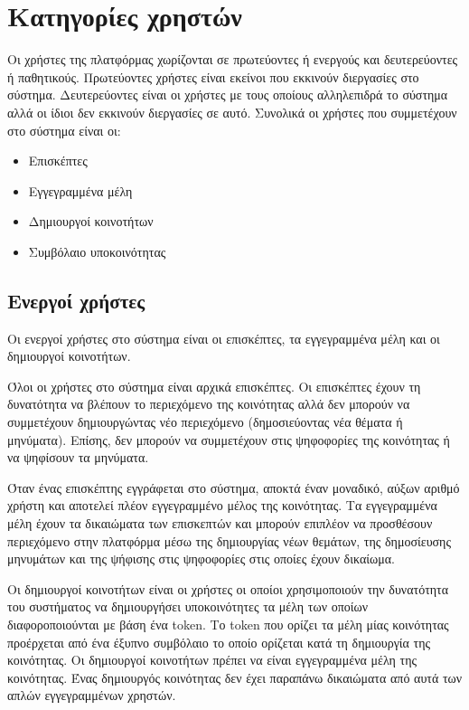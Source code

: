 \section{Κατηγορίες χρηστών} \label{section:3-2-user-categories}

Οι χρήστες της πλατφόρμας χωρίζονται σε πρωτεύοντες ή ενεργούς και δευτερεύοντες ή παθητικούς. Πρωτεύοντες χρήστες είναι εκείνοι που εκκινούν διεργασίες στο σύστημα. Δευτερεύοντες είναι οι χρήστες με τους οποίους αλληλεπιδρά το σύστημα αλλά οι ίδιοι δεν εκκινούν διεργασίες σε αυτό. Συνολικά οι χρήστες που συμμετέχουν στο σύστημα είναι οι:

\begin{itemize}
    \item Επισκέπτες
    \item Εγγεγραμμένα μέλη
    \item Δημιουργοί κοινοτήτων
    \item Συμβόλαιο υποκοινότητας
\end{itemize}

\subsection{Ενεργοί χρήστες}

Οι ενεργοί χρήστες στο σύστημα είναι οι επισκέπτες, τα εγγεγραμμένα μέλη και οι δημιουργοί κοινοτήτων.

Όλοι οι χρήστες στο σύστημα είναι αρχικά επισκέπτες. Οι επισκέπτες έχουν τη δυνατότητα να βλέπουν το περιεχόμενο της κοινότητας αλλά δεν μπορούν να συμμετέχουν δημιουργώντας νέο περιεχόμενο (δημοσιεύοντας νέα θέματα ή μηνύματα). Επίσης, δεν μπορούν να συμμετέχουν στις ψηφοφορίες της κοινότητας ή να ψηφίσουν τα μηνύματα.

Όταν ένας επισκέπτης εγγράφεται στο σύστημα, αποκτά έναν μοναδικό, αύξων αριθμό χρήστη και αποτελεί πλέον εγγεγραμμένο μέλος της κοινότητας. Τα εγγεγραμμένα μέλη έχουν τα δικαιώματα των επισκεπτών και μπορούν επιπλέον να προσθέσουν περιεχόμενο στην πλατφόρμα μέσω της δημιουργίας νέων θεμάτων, της δημοσίευσης μηνυμάτων και της ψήφισης στις ψηφοφορίες στις οποίες έχουν δικαίωμα.

Οι δημιουργοί κοινοτήτων είναι οι χρήστες οι οποίοι χρησιμοποιούν την δυνατότητα του συστήματος να δημιουργήσει υποκοινότητες τα μέλη των οποίων διαφοροποιούνται με βάση ένα token. Το token που ορίζει τα μέλη μίας κοινότητας προέρχεται από ένα έξυπνο συμβόλαιο το οποίο ορίζεται κατά τη δημιουργία της κοινότητας. Οι δημιουργοί κοινοτήτων πρέπει να είναι εγγεγραμμένα μέλη της κοινότητας. Ένας δημιουργός κοινότητας δεν έχει παραπάνω δικαιώματα από αυτά των απλών εγγεγραμμένων χρηστών.

